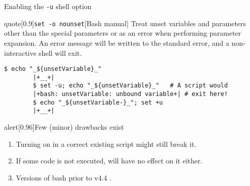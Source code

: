 \begin{frame}[fragile]{Enabling the \;\texttt{-u}\; shell option}
    \vspace{-3mm}
    \begin{varblock}{quote}[0.9\textwidth]{\texttt{set -o nounset}}[Bash manual]
        Treat unset variables and parameters other than the special parameters  or \PB{\texttt{*}} as an error when performing parameter expansion.
        An error message will be written to the standard error, and a non-interactive shell will exit.
    \end{varblock}
    \begin{lstlisting}[style=myBash, numbers=none, belowskip=-4mm]
        $ echo "_${unsetVariable}_"
        |+__+|
        $ set -u; echo "_${unsetVariable}_"   # A script would
        |+bash: unsetVariable: unbound variable+| # exit here!
        $ echo "_${unsetVariable-}_"; set +u
        |+__+|
    \end{lstlisting}
    \begin{varblock}{alert}[0.96\textwidth]{Few (minor) drawbacks exist}
        \begin{enumerate}
            \small
            \item Turning  on in a correct existing script might still break it.
            \item If some code is not executed,  will have no effect on it either.
            \item Versions of bash \alert{prior to v4.4} .
        \end{enumerate}
    \end{varblock}
\end{frame}
